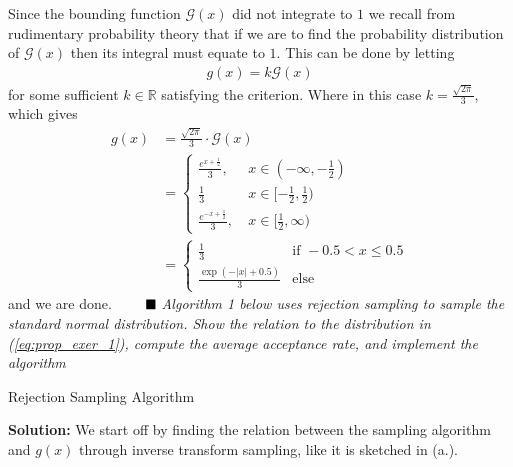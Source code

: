 Since the bounding function $\mathcal{G}(x)$ did not integrate to $1$ we recall from rudimentary probability theory that if we are to find the probability distribution of $\mathcal{G}(x)$ then its integral must equate to $1$. This can be done by letting 
\begin{align*}
    g(x) = k\mathcal{G}(x)
\end{align*}
for some sufficient $k \in \mathbb{R}$ satisfying the criterion. Where in this case $k = \frac{\sqrt{2 \pi}}{3}$, which gives 
\begin{align*}
    g(x) &= \frac{\sqrt{2 \pi}}{3} \cdot \mathcal{G}(x) \\[5pt]
    &= \begin{cases}
         \frac{e^{x + \frac{1}{2}}}{3} , \ &x \in (-\infty, -\frac{1}{2}) \\[5pt]
        \frac{1}{3} \ &x \in [-\frac{1}{2}, \frac{1}{2}) \\[5pt]
         \frac{e^{- x + \frac{1}{2}}}{3}, \ &x \in [\frac{1}{2}, \infty)
    \end{cases} \\[15pt]
    &= \begin{cases}
    \frac{1}{3} & \text{if } -0.5 < x \leq 0.5 \\[5pt]
    \frac{\exp(-|x| + 0.5)}{3} & \text{else}
\end{cases}
\end{align*}
and we are done. $\Q$
\emph{Algorithm 1 below uses rejection sampling to sample the standard normal distribution.
Show the relation to the distribution in (\ref{eq:prop_exer_1}), compute the average acceptance rate, and
implement the algorithm} \spaze 
\begin{algorithm}[H]
\SetAlgoLined
{}
\caption{Rejection Sampling Algorithm}
\end{algorithm}
\textbf{Solution:} \spaze 
We start off by finding the relation between the sampling algorithm and $g(x)$ through inverse transform sampling, like it is sketched in (a.). 

